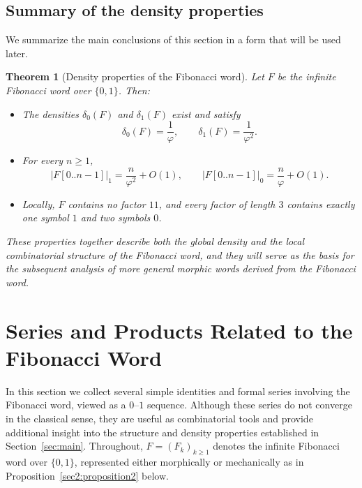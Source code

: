 \documentclass[12pt, a4paper]{article}
\newtheorem{theorem}{Theorem}[section]
\begin{document}
\subsection{Summary of the density properties}

We summarize the main conclusions of this section in a form that will be used later.

\begin{theorem}[Density properties of the Fibonacci word]\label{thm:summary-density}
Let $F$ be the infinite Fibonacci word over $\{0,1\}$. Then:
\begin{itemize}
  \item[(i)] The densities $\delta_0(F)$ and $\delta_1(F)$ exist and satisfy
  \[
  \delta_0(F) = \frac{1}{\varphi},
  \qquad
  \delta_1(F) = \frac{1}{\varphi^2}.
  \]
  \item[(ii)] For every $n \ge 1$,
  \[
  |F[0..n-1]|_1 = \frac{n}{\varphi^2} + O(1),
  \qquad
  |F[0..n-1]|_0 = \frac{n}{\varphi} + O(1).
  \]
  \item[(iii)] Locally, $F$ contains no factor $11$, and every factor of length $3$ contains exactly one symbol $1$ and two symbols $0$.
\end{itemize}
These properties together describe both the global density and the local combinatorial structure of the Fibonacci word, and they will serve as the basis for the subsequent analysis of more general morphic words derived from the Fibonacci word.
\end{theorem}
\section{Series and Products Related to the Fibonacci Word}\label{sec:series-products}

In this section we collect several simple identities and formal series involving the Fibonacci word, viewed as a $0$–$1$ sequence. Although these series do not converge in the classical sense, they are useful as combinatorial tools and provide additional insight into the structure and density properties established in Section~\ref{sec:main}. Throughout, $F = (F_k)_{k \ge 1}$ denotes the infinite Fibonacci word over $\{0,1\}$, represented either morphically or mechanically as in Proposition~\ref{sec2:proposition2} below.
\end{document}
